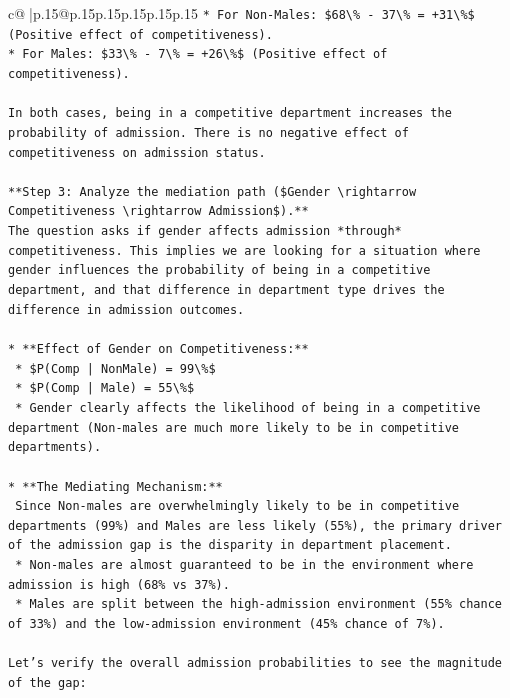 \documentclass{article}
\begin{document}
{\begin{supertabular}{c@{$\;$}|p{.15\linewidth}@{}p{.15\linewidth}p{.15\linewidth}p{.15\linewidth}p{.15\linewidth}p{.15\linewidth}}
{{{\texttt{*   For Non{-}Males: \$68\textbackslash{}\% {-} 37\textbackslash{}\% = +31\textbackslash{}\%\$ (Positive effect of competitiveness).} \\
\texttt{*   For Males: \$33\textbackslash{}\% {-} 7\textbackslash{}\% = +26\textbackslash{}\%\$ (Positive effect of competitiveness).} \\
\\ 
\texttt{In both cases, being in a competitive department increases the probability of admission. There is no negative effect of competitiveness on admission status.} \\
\\ 
\texttt{**Step 3: Analyze the mediation path (\$Gender \textbackslash{}rightarrow Competitiveness \textbackslash{}rightarrow Admission\$).**} \\
\texttt{The question asks if gender affects admission *through* competitiveness. This implies we are looking for a situation where gender influences the probability of being in a competitive department, and that difference in department type drives the difference in admission outcomes.} \\
\\ 
\texttt{*   **Effect of Gender on Competitiveness:**} \\
\texttt{    *   \$P(Comp | NonMale) = 99\textbackslash{}\%\$} \\
\texttt{    *   \$P(Comp | Male) = 55\textbackslash{}\%\$} \\
\texttt{    *   Gender clearly affects the likelihood of being in a competitive department (Non{-}males are much more likely to be in competitive departments).} \\
\\ 
\texttt{*   **The Mediating Mechanism:**} \\
\texttt{    Since Non{-}males are overwhelmingly likely to be in competitive departments (99\%) and Males are less likely (55\%), the primary driver of the admission gap is the disparity in department placement.} \\
\texttt{    *   Non{-}males are almost guaranteed to be in the environment where admission is high (68\% vs 37\%).} \\
\texttt{    *   Males are split between the high{-}admission environment (55\% chance of 33\%) and the low{-}admission environment (45\% chance of 7\%).} \\
\\ 
\texttt{Let's verify the overall admission probabilities to see the magnitude of the gap:} \\
}}}
\end{supertabular}}
\end{document}
